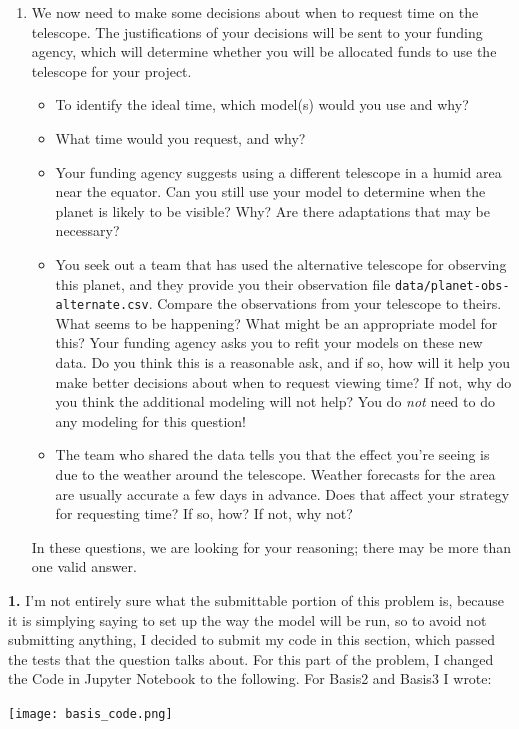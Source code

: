 \documentclass[submit]{harvardml}
\begin{document}
\begin{framed}
\begin{enumerate}
\item We now need to make some decisions about when to request time on
  the telescope.  The justifications of your decisions will be sent to
  your funding agency, which will determine whether you will be
  allocated funds to use the telescope for your project.
  \begin{itemize}
  \item To identify the ideal time, which model(s) would you use and why?
  \item What time would you request, and why?
  \item Your funding agency suggests using a different telescope in a
    humid area near the equator. Can you still use your model to
    determine when the planet is likely to be visible?  Why? Are there
    adaptations that may be necessary?
  \item You seek out a team that has used the alternative telescope
    for observing this planet, and they provide you their observation
    file \verb|data/planet-obs-alternate.csv|.
    Compare the observations from your telescope to theirs.  What
    seems to be happening?  What might be an appropriate model for
    this? Your funding agency asks you to refit your models on these
    new data.  Do you think this is a reasonable ask, and if so, how
    will it help you make better decisions about when to request
    viewing time?  If not, why do you think the additional modeling
    will not help? You do \emph{not} need to do any modeling for this
    question!
  \item The team who shared the data tells you that the effect you're
    seeing is due to the weather around the telescope.  Weather
    forecasts for the area are usually accurate a few days in
    advance. Does that affect your strategy for requesting time?  If
    so, how?  If not, why not?
  \end{itemize}
  In these questions, we are looking for your reasoning; there may be
  more than one valid answer.

\end{enumerate}
\end{framed}

\newpage
\textbf{1.} I'm not entirely sure what the submittable portion of this problem is, because it is simplying saying to set up the way the model will be run,
so to avoid not submitting anything, I decided to submit my code in this section, which passed the tests that the question talks about. 
For this part of the problem, I changed the Code in Jupyter Notebook to the following. For Basis2 and Basis3 I wrote: \\
\begin{center}
  \texttt{[image: basis\_code.png]}
\end{center}
\end{document}
